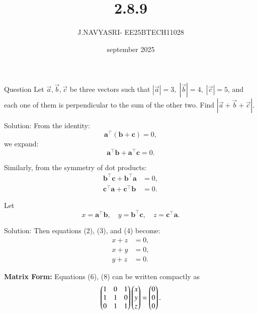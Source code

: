 \documentclass{beamer}
\title %
{2.8.9}
\date{september 2025}
\author %
{J.NAVYASRI- EE25BTECH11028}
\begin{document}
\frame{\titlepage}
\begin{frame}{Question}
Let $\vec{a}, \vec{b}, \vec{c}$ be three vectors such that 
$|\vec{a}|=3,\; |\vec{b}|=4,\; |\vec{c}|=5$, and each one of them is perpendicular to the sum of the other two. 
Find $|\vec{a}+\vec{b}+\vec{c}|$.
\end{frame}


\begin{frame}{Solution:}
From the identity:
\begin{equation} \label{eq1}
\mathbf{a}^\top(\mathbf{b} + \mathbf{c}) = 0,
\end{equation}
we expand:
\begin{equation} \label{eq2}
\mathbf{a}^\top \mathbf{b} + \mathbf{a}^\top \mathbf{c} = 0.
\end{equation}

Similarly, from the symmetry of dot products:
\begin{align}
\mathbf{b}^\top \mathbf{c} + \mathbf{b}^\top \mathbf{a} &= 0, \label{eq3} \\
\mathbf{c}^\top \mathbf{a} + \mathbf{c}^\top \mathbf{b} &= 0. \label{eq4}
\end{align}

Let
\begin{equation} \label{eq5}
x = \mathbf{a}^\top \mathbf{b}, \quad y = \mathbf{b}^\top \mathbf{c}, \quad z = \mathbf{c}^\top \mathbf{a}.
\end{equation}
\end{frame}

\begin{frame}{Solution:}
Then equations (2), (3), and (4) become:
\begin{align}
x + z &= 0, \label{eq6} \\
x + y &= 0, \label{eq7} \\
y + z &= 0. \label{eq8}
\end{align}

\bigskip

\noindent
\textbf{Matrix Form:}  
Equations (6), (8) can be written compactly as
\[
\begin{pmatrix}
1 & 0 & 1 \\
1 & 1 & 0 \\
0 & 1 & 1
\end{pmatrix}
\begin{pmatrix}
x \\ y \\ z
\end{pmatrix}
=
\begin{pmatrix}
0 \\ 0 \\ 0
\end{pmatrix}.
\]

\end{frame}
\end{document}
